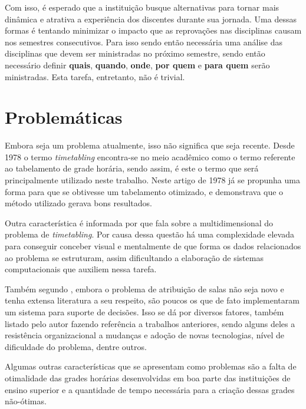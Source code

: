 Com isso, é esperado que a instituição busque alternativas para tornar mais dinâmica e atrativa a experiência dos discentes durante sua jornada. Uma dessas formas é tentando minimizar o impacto que as reprovações nas disciplinas causam nos semestres consecutivos. Para isso sendo então necessária uma análise das disciplinas que devem ser ministradas no próximo semestre, sendo então necessário definir \textbf{quais}, \textbf{quando}, \textbf{onde}, \textbf{por quem} e \textbf{para quem} serão ministradas. Esta tarefa, entretanto, não é trivial.

\section{Problemáticas} %

Embora seja um problema atualmente, isso não significa que seja recente. Desde 1978 \cite{barham_simple_1978} o termo \textit{timetabling} encontra-se no meio acadêmico como o termo referente ao tabelamento de grade horária, sendo assim, é este o termo que será principalmente utilizado neste trabalho. Neste artigo de 1978 já se propunha uma forma para que se obtivesse um tabelamento otimizado, e demonstrava que o método utilizado gerava bons resultados.

Outra característica é informada por  que fala sobre a multidimensional do problema de \textit{timetabling}. Por causa dessa questão há uma complexidade elevada para conseguir conceber visual e mentalmente de que forma os dados relacionados ao problema se estruturam, assim dificultando a elaboração de sistemas computacionais que auxiliem nessa tarefa.

Também segundo , embora o problema de atribuição de salas não seja novo e tenha extensa literatura a seu respeito, são poucos os que de fato implementaram um sistema para suporte de decisões. Isso se dá por diversos fatores, também listado pelo autor fazendo referência a trabalhos anteriores, sendo alguns deles a resistência organizacional a mudanças e adoção de novas tecnologias, nível de dificuldade do problema, dentre outros.


Algumas outras características que se apresentam como problemas são a falta de otimalidade das grades horárias desenvolvidas em boa parte das instituições de ensino superior e a quantidade de tempo necessária para a criação dessas grades não-ótimas.

